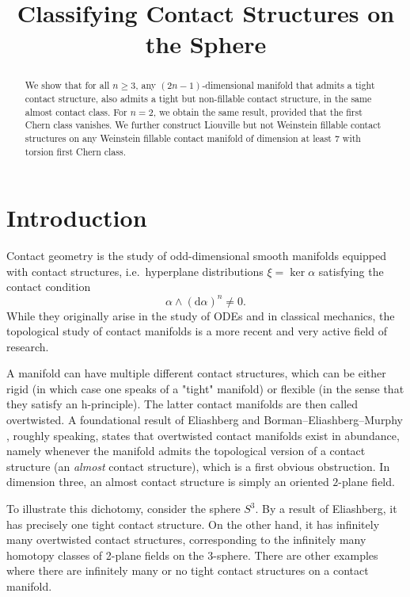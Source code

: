 \documentclass{amsart}
\renewcommand*{\d}{\mathrm{d}}
\begin{document}
\title{Classifying Contact Structures on the Sphere}
\address{}
\date{}

\begin{abstract}
We show that for all $n \ge 3$, any $(2n -1)$-dimensional manifold that admits a tight contact
structure, also admits a tight but non-fillable contact structure, in the same almost contact class.
For $n = 2$, we obtain the same result, provided that the first Chern class vanishes. 
We further construct Liouville but not Weinstein fillable contact structures on any Weinstein fillable contact manifold of dimension at least 7 with torsion first Chern class.
\end{abstract}

\maketitle
\section*{Introduction}
Contact geometry is the study of odd-dimensional smooth manifolds equipped with contact structures, i.e.\ hyperplane distributions $\xi = \ker \alpha$ satisfying the contact condition
\[
    \alpha \wedge (\d \alpha)^n \neq 0.
\]
While they originally arise in the study of ODEs and in classical mechanics, the topological study of contact manifolds is a more recent and very active field of research.

A manifold can have multiple different contact structures, which can be either rigid (in which case one speaks of a "tight" manifold) or flexible (in the sense that they satisfy an h-principle). The latter contact manifolds are then called overtwisted. A foundational result of Eliashberg \cite{Eliashberg89} and Borman--Eliashberg--Murphy \cite{BEM15}, roughly speaking, states that overtwisted contact manifolds exist in abundance, namely whenever the manifold admits the topological version of a contact structure (an \emph{almost} contact structure), which is a first obvious obstruction. In dimension three, an almost contact structure is simply an oriented $2$-plane field.

To illustrate this dichotomy, consider the sphere $S^3$. By a result of Eliashberg, it has precisely one tight contact structure. On the other hand, it has infinitely many overtwisted contact structures, corresponding to the infinitely many homotopy classes of 2-plane fields on the 3-sphere. There are other examples where there are infinitely many or no tight contact structures on a contact manifold.
\end{document}

